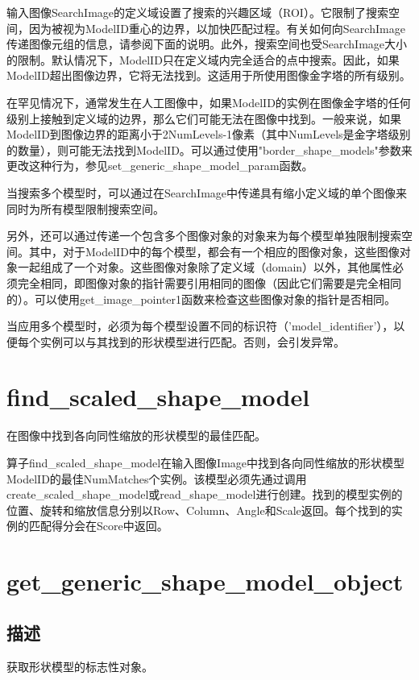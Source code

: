 \documentclass{article}
\begin{document}
输入图像SearchImage的定义域设置了搜索的兴趣区域（ROI）。它限制了搜索空间，因为被视为ModelID重心的边界，以加快匹配过程。有关如何向SearchImage传递图像元组的信息，请参阅下面的说明。此外，搜索空间也受SearchImage大小的限制。默认情况下，ModelID只在定义域内完全适合的点中搜索。因此，如果ModelID超出图像边界，它将无法找到。这适用于所使用图像金字塔的所有级别。

在罕见情况下，通常发生在人工图像中，如果ModelID的实例在图像金字塔的任何级别上接触到定义域的边界，那么它们可能无法在图像中找到。一般来说，如果ModelID到图像边界的距离小于2NumLevels-1像素（其中NumLevels是金字塔级别的数量），则可能无法找到ModelID。可以通过使用"border\_shape\_models"参数来更改这种行为，参见set\_generic\_shape\_model\_param函数。

当搜索多个模型时，可以通过在SearchImage中传递具有缩小定义域的单个图像来同时为所有模型限制搜索空间。

另外，还可以通过传递一个包含多个图像对象的对象来为每个模型单独限制搜索空间。其中，对于ModelID中的每个模型，都会有一个相应的图像对象，这些图像对象一起组成了一个对象。这些图像对象除了定义域（domain）以外，其他属性必须完全相同，即图像对象的指针需要引用相同的图像（因此它们需要是完全相同的）。可以使用get\_image\_pointer1函数来检查这些图像对象的指针是否相同。

当应用多个模型时，必须为每个模型设置不同的标识符（'model\_identifier'），以便每个实例可以与其找到的形状模型进行匹配。否则，会引发异常。

\section{find\_scaled\_shape\_model}
在图像中找到各向同性缩放的形状模型的最佳匹配。

算子find\_scaled\_shape\_model在输入图像Image中找到各向同性缩放的形状模型ModelID的最佳NumMatches个实例。该模型必须先通过调用create\_scaled\_shape\_model或read\_shape\_model进行创建。找到的模型实例的位置、旋转和缩放信息分别以Row、Column、Angle和Scale返回。每个找到的实例的匹配得分会在Score中返回。

\section{get\_generic\_shape\_model\_object}

\subsection{描述}
获取形状模型的标志性对象。
\end{document}
